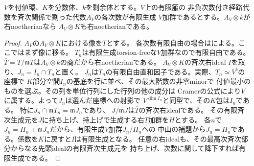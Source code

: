 \begin{lemma}[付値環を用いた斉次右noetherian性の持上げ]
\label{lem:ou-val-noetherian}
$V$を付値環、$K$を分数体、$k$を剰余体とする。$V$上の有限箙の
非負次数付き経路代数を斉次関係で割った代数$A_V$の各次数が有限生成
$V$加群であるとする。$A_V\otimes k$が右noetherianなら
$A_V\otimes K$も右noetherianである。
\end{lemma}
\begin{proof}
$A_V$の$A_V\otimes K$における像を$T$とする。
各次数有限自由の場合は\cite[Lemma~8.9]{ATV1990}による。ここではまず像に移る。
$T_n$は有限生成torsion-freeな$V$加群なので有限自由である。
$\overline T=T/\mathfrak m T$は$A_V\otimes k$の商だから右noetherianである。
$A_V\otimes K$の斉次右ideal $I$を取り、$J_n=I_n\cap T_n$と置く。
$J_n$は$T_n$の有限自由直和因子である。実際、$T_n\simeq V^b$の座標で
$K$部分空間$I_n$の基底を行に並べ、その最大階数の非零minorで
付値最小のものを選ぶ。その列を単位行列にした行列の他の成分は
Cramerの公式により$V$に属する。よって$J_n$は選んだ座標への射影で
$V^{\dim I_n}$と同型で、その$K$包は$I_n$である。
特に$J_n\cap\mathfrak m T_n=\mathfrak m J_n$であり、
$J/\mathfrak m J$は$\overline T$の斉次右idealである。
その有限斉次生成元を$J$に持ち上げ、持上げで生成する右$T$加群を$H$とする。
各$n$で$J_n=H_n+\mathfrak m J_n$だから、有限生成$V$加群$J_n/H_n$への
中山の補題から$J_n=H_n$である。係数を$K$に戻すと$I$は有限生成となる。
任意の右idealも、その最高次斉次部分からなる先頭idealの有限斉次生成元を
持ち上げ、次数に関して降下すれば有限生成である。
\end{proof}

